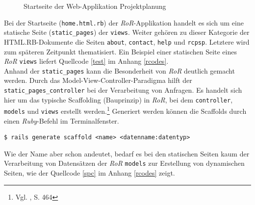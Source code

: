 \documentclass[a4paper,12pt,parskip,bibtotoc,liststotoc]{article}
\begin{document}
\begin{figure}[h!]
  \begin{center}
    \caption{Startseite der Web-Applikation Projektplanung}  \label{Start}
  \end{center}
\end{figure}

Bei der Startseite (\texttt{home.html.rb}) der \textit{RoR}-Applikation handelt es sich um eine statische Seite (\texttt{static\_pages}) der \texttt{views}. Weiter gehören zu dieser Kategorie der HTML.RB-Dokumente die Seiten \texttt{about}, \texttt{contact}, \texttt{help} und \texttt{rcpsp}. Letztere wird zum späteren Zeitpunkt thematisiert. Ein Beispiel einer statischen Seite eines \textit{RoR} \texttt{views} liefert Quellcode \ref{test} im Anhang \ref{rcodes}.\\

Anhand der \texttt{static\_pages} kann die Besonderheit von \textit{RoR} deutlich gemacht werden. Durch das Model-View-Controller-Paradigma hilft der \texttt{static\_pages\_controller} bei der Verarbeitung von Anfragen. Es handelt sich hier um das typische Scaffolding (Bauprinzip) in \textit{RoR}, bei dem \texttt{controller}, \texttt{models} und \texttt{views} erstellt werden.\footnote{Vgl. \cite{walter2008ruby}, S. 464} Generiert werden können die Scaffolds durch  einen \textit{Ruby}-Befehl im Terminalfenster.
\begin{lstlisting}[style=Befehl]
$ rails generate scaffold <name> <datenname:datentyp> 
\end{lstlisting}

Wie der Name aber schon andeutet, bedarf es bei den statischen Seiten kaum der Verarbeitung von Datensätzen der \textit{RoR} \texttt{models} zur Erstellung von dynamischen Seiten, wie der Quellcode \ref{spc} im Anhang \ref{rcodes} zeigt.\\
\end{document}
